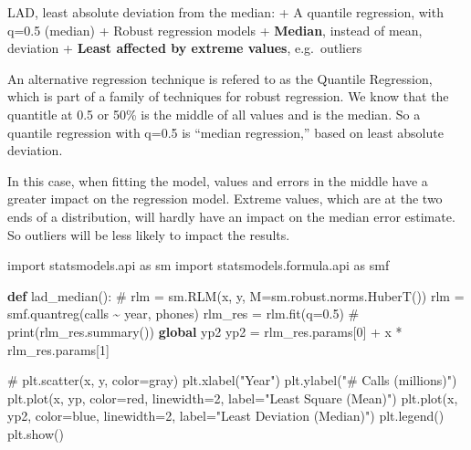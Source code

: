 \documentclass[
  letterpaper,
]{scrbook}
\newenvironment{Shaded}{\begin{snugshade}}{\end{snugshade}}
\newcommand{\CommentTok}[1]{\textcolor[rgb]{0.37,0.37,0.37}{#1}}
\newcommand{\DecValTok}[1]{\textcolor[rgb]{0.68,0.00,0.00}{#1}}
\newcommand{\FloatTok}[1]{\textcolor[rgb]{0.68,0.00,0.00}{#1}}
\newcommand{\ImportTok}[1]{\textcolor[rgb]{0.00,0.46,0.62}{#1}}
\newcommand{\KeywordTok}[1]{\textcolor[rgb]{0.00,0.23,0.31}{\textbf{#1}}}
\newcommand{\NormalTok}[1]{\textcolor[rgb]{0.00,0.23,0.31}{#1}}
\newcommand{\OperatorTok}[1]{\textcolor[rgb]{0.37,0.37,0.37}{#1}}
\newcommand{\StringTok}[1]{\textcolor[rgb]{0.13,0.47,0.30}{#1}}
\begin{document}
LAD, least absolute deviation from the median: + A quantile regression,
with q=0.5 (median) + Robust regression models + \textbf{Median},
instead of mean, deviation + \textbf{Least affected by extreme values},
e.g.~outliers

An alternative regression technique is refered to as the Quantile
Regression, which is part of a family of techniques for robust
regression. We know that the quantitle at 0.5 or 50\% is the middle of
all values and is the median. So a quantile regression with q=0.5 is
``median regression,'' based on least absolute deviation.

In this case, when fitting the model, values and errors in the middle
have a greater impact on the regression model. Extreme values, which are
at the two ends of a distribution, will hardly have an impact on the
median error estimate. So outliers will be less likely to impact the
results.

\begin{Shaded}
\begin{Highlighting}[]
\ImportTok{import}\NormalTok{ statsmodels.api }\ImportTok{as}\NormalTok{ sm}
\ImportTok{import}\NormalTok{ statsmodels.formula.api }\ImportTok{as}\NormalTok{ smf}

\KeywordTok{def}\NormalTok{ lad\_median():}
    \CommentTok{\# rlm = sm.RLM(x, y, M=sm.robust.norms.HuberT())}
\NormalTok{    rlm }\OperatorTok{=}\NormalTok{ smf.quantreg(}\StringTok{\textquotesingle{}calls \textasciitilde{} year\textquotesingle{}}\NormalTok{, phones)}
\NormalTok{    rlm\_res }\OperatorTok{=}\NormalTok{ rlm.fit(q}\OperatorTok{=}\FloatTok{0.5}\NormalTok{)}
    \CommentTok{\# print(rlm\_res.summary())}
    \KeywordTok{global}\NormalTok{ yp2}
\NormalTok{    yp2 }\OperatorTok{=}\NormalTok{ rlm\_res.params[}\DecValTok{0}\NormalTok{] }\OperatorTok{+}\NormalTok{ x }\OperatorTok{*}\NormalTok{ rlm\_res.params[}\DecValTok{1}\NormalTok{]}

    \CommentTok{\# plt.scatter(x, y,  color=\textquotesingle{}gray\textquotesingle{})}
\NormalTok{    plt.xlabel(}\StringTok{"Year"}\NormalTok{)}
\NormalTok{    plt.ylabel(}\StringTok{"\# Calls (millions)"}\NormalTok{)}
\NormalTok{    plt.plot(x, yp, color}\OperatorTok{=}\StringTok{\textquotesingle{}red\textquotesingle{}}\NormalTok{, linewidth}\OperatorTok{=}\DecValTok{2}\NormalTok{, label}\OperatorTok{=}\StringTok{"Least Square (Mean)"}\NormalTok{)}
\NormalTok{    plt.plot(x, yp2, color}\OperatorTok{=}\StringTok{\textquotesingle{}blue\textquotesingle{}}\NormalTok{, linewidth}\OperatorTok{=}\DecValTok{2}\NormalTok{, label}\OperatorTok{=}\StringTok{"Least Deviation (Median)"}\NormalTok{)}
\NormalTok{    plt.legend()}
\NormalTok{    plt.show()}
\end{Highlighting}
\end{Shaded}
\end{document}
